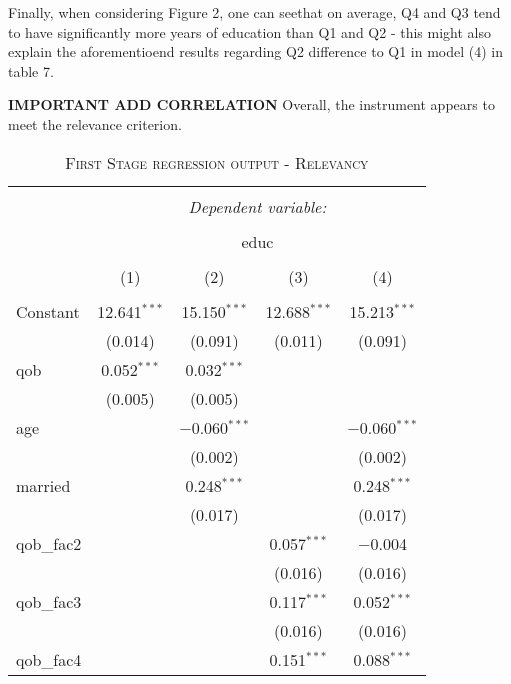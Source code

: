 \documentclass[a4paper]{article}
\begin{document}
Finally, when considering Figure 2, one can seethat on average, Q4 and Q3 tend to have significantly more years of education than Q1 and Q2 - this might also explain the aforementioend results regarding Q2 difference to Q1 in model (4) in table 7. 


\textbf{IMPORTANT ADD CORRELATION}
Overall, the instrument appears to meet the relevance criterion. 






\begin{table}[!htbp] \centering 
\begin{adjustwidth}{0.cm}{-0cm}
\begin{threeparttable}
\small
\captionsetup{font=small, justification=raggedright,singlelinecheck=false}
\caption{\textsc{First Stage regression output - Relevancy}}
\centering 
  \label{}
\small 
\begin{tabular}{@{\extracolsep{-2pt}}lcccc} 
\\[-5.8ex]\hline 
\hline \\[-1.8ex] 
 & \multicolumn{4}{c}{\textit{Dependent variable:}} \\ 
\cline{2-5} 
\\[-1.8ex] & \multicolumn{4}{c}{educ} \\ 
\\[-1.8ex] & (1) & (2) & (3) & (4)\\ 
\hline \\[-1.8ex] 
 Constant & 12.641$^{***}$ & 15.150$^{***}$ & 12.688$^{***}$ & 15.213$^{***}$ \\ 
  & (0.014) & (0.091) & (0.011) & (0.091) \\ 
  qob & 0.052$^{***}$ & 0.032$^{***}$ &  &  \\ 
  & (0.005) & (0.005) &  &  \\ 
  age &  & $-$0.060$^{***}$ &  & $-$0.060$^{***}$ \\ 
  &  & (0.002) &  & (0.002) \\ 
  married &  & 0.248$^{***}$ &  & 0.248$^{***}$ \\ 
  &  & (0.017) &  & (0.017) \\ 
  qob\_fac2 &  &  & 0.057$^{***}$ & $-$0.004 \\ 
  &  &  & (0.016) & (0.016) \\ 
  qob\_fac3 &  &  & 0.117$^{***}$ & 0.052$^{***}$ \\ 
  &  &  & (0.016) & (0.016) \\ 
  qob\_fac4 &  &  & 0.151$^{***}$ & 0.088$^{***}$ \\ 

\end{tabular}
\end{threeparttable}
\end{adjustwidth}
\end{table}
\end{document}
